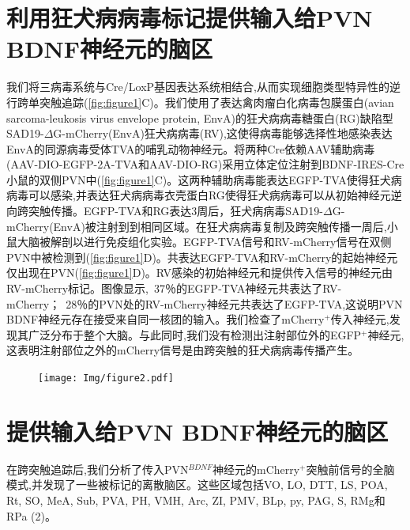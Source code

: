 \section{利用狂犬病病毒标记提供输入给PVN BDNF神经元的脑区}
我们将三病毒系统与Cre/LoxP基因表达系统\citep{wickersham2007monosynaptic}相结合,从而实现细胞类型特异性的逆行跨单突触追踪(\figurename{\ref{fig:figure1}C})。我们使用了表达禽肉瘤白化病毒包膜蛋白(avian sarcoma-leukosis virus envelope protein, EnvA)的狂犬病病毒糖蛋白(RG)缺陷型SAD19-$\Delta$G-mCherry(EnvA)狂犬病病毒(RV),这使得病毒能够选择性地感染表达EnvA的同源病毒受体TVA的哺乳动物神经元。将两种Cre依赖AAV辅助病毒(AAV-DIO-EGFP-2A-TVA和AAV-DIO-RG)采用立体定位注射到BDNF-IRES-Cre小鼠的双侧PVN中(\figurename{\ref{fig:figure1}C})。这两种辅助病毒能表达EGFP-TVA使得狂犬病病毒可以感染,并表达狂犬病病毒衣壳蛋白RG使得狂犬病病毒可以从初始神经元逆向跨突触传播。EGFP-TVA和RG表达3周后，狂犬病病毒SAD19-$\Delta$G-mCherry(EnvA)被注射到到相同区域。在狂犬病病毒复制及跨突触传播一周后,小鼠大脑被解剖以进行免疫组化实验。EGFP-TVA信号和RV-mCherry信号在双侧PVN中被检测到(\figurename{\ref{fig:figure1}D})。共表达EGFP-TVA和RV-mCherry的起始神经元仅出现在PVN(\figurename{\ref{fig:figure1}D})。RV感染的初始神经元和提供传入信号的神经元由RV-mCherry标记。图像显示,~37％的EGFP-TVA神经元共表达了RV-mCherry；~28％的PVN处的RV-mCherry神经元共表达了EGFP-TVA,这说明PVN BDNF神经元存在接受来自同一核团的输入。我们检查了mCherry$^{+}$传入神经元,发现其广泛分布于整个大脑。与此同时,我们没有检测出注射部位外的EGFP$^{+}$神经元,这表明注射部位之外的mCherry信号是由跨突触的狂犬病病毒传播产生。

\begin{figure}[!htbp]
    \centering
    \texttt{[image: Img/figure2.pdf]}
    \label{fig:figure2}
\end{figure}

\section{提供输入给PVN BDNF神经元的脑区}
在跨突触追踪后,我们分析了传入PVN$^{BDNF}$神经元的mCherry$^{+}$突触前信号的全脑模式,并发现了一些被标记的离散脑区。这些区域包括VO, LO, DTT, LS, POA, Rt, SO, MeA, Sub, PVA, PH, VMH, Arc, ZI, PMV, BLp, py, PAG, S, RMg和RPa (\figurename{2})。

